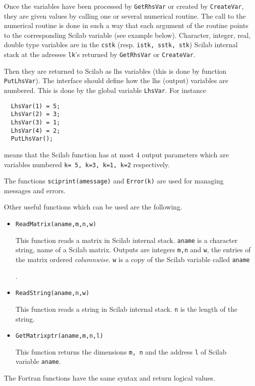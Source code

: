 Once the  variables have been processed by {\tt GetRhsVar} or created
by {\tt CreateVar}, they are given values by calling one or several 
numerical routine. The call to the numerical routine is done
in such a way that each argument of the routine points to the
corresponding Scilab variable (see example below). 
Character, integer, real, double type variables are 
in the {\tt cstk} (resp. {\tt istk, sstk, stk}) Scilab internal stack
at the adresses {\tt lk}'s returned by {\tt GetRhsVar} or {\tt CreateVar}. 

Then they are returned to Scilab as lhs variables
(this is done by function {\tt PutLhsVar}).
The interface should define how the lhs (output) variables are
numbered. This is done by the global variable {\tt LhsVar}.
For instance
\begin{verbatim}
  LhsVar(1) = 5;
  LhsVar(2) = 3;
  LhsVar(3) = 1;
  LhsVar(4) = 2;
  PutLhsVar();
\end{verbatim}
means that the Scilab function has at most 4 output parameters
which are variables numbered \verb!k= 5, k=3, k=1, k=2! respectively.

The functions \verb!sciprint(amessage)! and \verb!Error(k)! are used
for managing messages and errors.

Other useful functions which can be used are the following.
\begin{itemize}
\item{
\begin{verbatim}
ReadMatrix(aname,m,n,w)
\end{verbatim}
This function reads a matrix in Scilab internal stack. \verb!aname! is
a character string, name of a Scilab matrix. Outputs are integers
\verb!m,n! and \verb!w!, the entries of the matrix ordered {\em columnwise}.
{\tt w} is a copy of the Scilab variable called {\tt aname}}.
\item{
\begin{verbatim}
ReadString(aname,n,w)
\end{verbatim}
This function reads a string in Scilab internal stack. \verb!n! is the
length of the string.
}
\item{
\begin{verbatim}
GetMatrixptr(aname,m,n,l)
\end{verbatim}
This function returns the dimensions \verb!m, n! and the address
\verb!l! of Scilab variable \verb!aname!.
}
\end{itemize}


The Fortran functions have the same syntax and return logical values.

